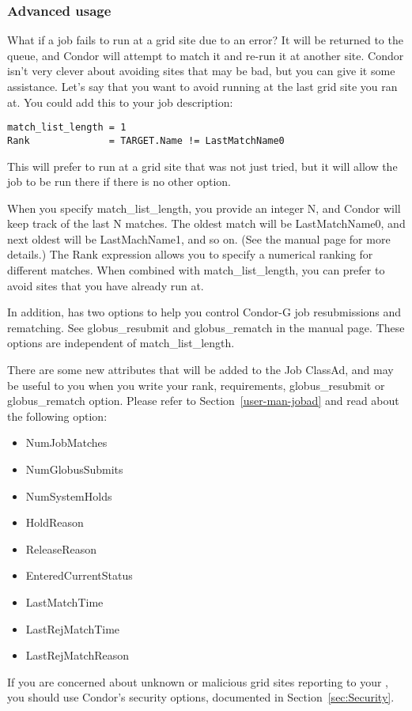 \subsubsection{Advanced usage}

What if a job fails to run at a grid site due to an error? It will be
returned to the queue, and Condor will attempt to match it and
re-run it at another site. Condor isn't very clever about avoiding
sites that may be bad, but you can give it some assistance. Let's say
that you want to avoid running at the last grid site you ran at. You
could add this to your job description:

\footnotesize
\begin{verbatim}
match_list_length = 1
Rank              = TARGET.Name != LastMatchName0
\end{verbatim}
\normalsize

This will prefer to run at a grid site that was not just tried, but it
will allow the job to be run there if there is no other option. 

When you specify match\_list\_length, you provide an integer N, and
Condor will keep track of the last N matches. The oldest match will be
LastMatchName0, and next oldest will be LastMachName1, and so on. (See
the  manual page for more details.) The Rank expression
allows you to specify a numerical ranking for different matches. When
combined with match\_list\_length, you can prefer to avoid sites that
you have already run at. 

In addition,  has two options to help you control
Condor-G job resubmissions and rematching.  See globus\_resubmit and
globus\_rematch in the  manual page. These options are
independent of match\_list\_length.

There are some new attributes that will be added to the Job ClassAd,
and may be useful to you when you write your rank, requirements,
globus\_resubmit or globus\_rematch option. Please refer to
Section~\ref{user-man-jobad} and read about the following option:

\begin{itemize}
\item NumJobMatches
\item NumGlobusSubmits
\item NumSystemHolds
\item HoldReason
\item ReleaseReason
\item EnteredCurrentStatus
\item LastMatchTime
\item LastRejMatchTime
\item LastRejMatchReason
\end{itemize}

If you are concerned about unknown or malicious grid sites reporting
to your , you should use Condor's security options,
documented in Section~\ref{sec:Security}.
